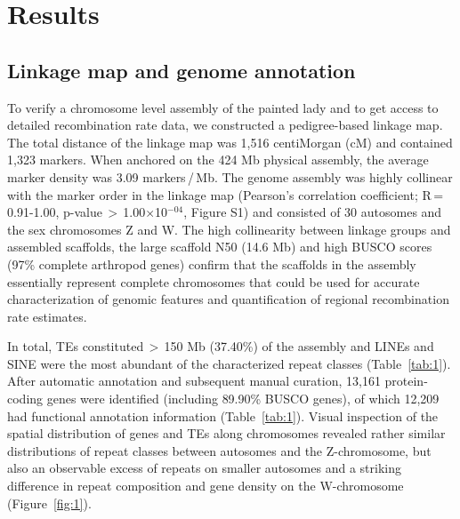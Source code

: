 \documentclass[twocolumn]{bmcart}%
\begin{document}
\section*{Results}
\subsection*{Linkage map and genome annotation}
To verify a chromosome level assembly of the painted lady \cite{lohse_genome_2021} and to get access to detailed recombination rate data, we constructed a pedigree-based linkage map. The total distance of the linkage map was 1,516 centiMorgan (cM) and contained 1,323 markers. When anchored on the 424 Mb physical assembly, the average marker density was 3.09 markers\,/\,Mb. The genome assembly was highly collinear with the marker order in the linkage map (Pearson’s correlation coefficient; R\,=\,0.91-1.00, p-value\,$>$\,1.00$\times$10$^{-04}$, Figure S1) and consisted of 30 autosomes and the sex chromosomes Z and W. The high collinearity between linkage groups and assembled scaffolds, the large scaffold N50 (14.6 Mb) and high BUSCO scores (97\% complete arthropod genes) confirm that the scaffolds in the assembly essentially represent complete chromosomes that could be used for accurate characterization of genomic features and quantification of regional recombination rate estimates.

In total, TEs constituted\,$>$\,150 Mb (37.40\%) of the assembly and LINEs and SINE were the most abundant of the characterized repeat classes (Table~\ref{tab:1}). After automatic annotation and subsequent manual curation, 13,161 protein-coding genes were identified (including 89.90\% BUSCO genes), of which 12,209 had functional annotation information (Table~\ref{tab:1}). Visual inspection of the spatial distribution of genes and TEs along chromosomes revealed rather similar distributions of repeat classes between autosomes and the Z-chromosome, but also an observable excess of repeats on smaller autosomes and a striking difference in repeat composition and gene density on the W-chromosome (Figure~\ref{fig:1}).
\end{document}
